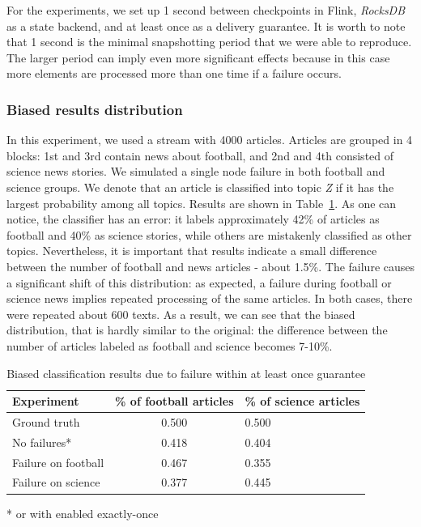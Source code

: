 
For the experiments, we set up 1 second between checkpoints in Flink, {\em RocksDB} as a state backend, and at least once as a delivery guarantee. It is worth to note that 1 second is the minimal snapshotting period that we were able to reproduce. The larger period can imply even more significant effects because in this case more elements are processed more than one time if a failure occurs.

\subsubsection{Biased results distribution}

In this experiment, we used a stream with 4000 articles. Articles are grouped in 4 blocks: 1st and 3rd contain news about football, and 2nd and 4th consisted of science news stories. We simulated a single node failure in both football and science groups. We denote that an article is classified into topic {\em Z} if it has the largest probability among all topics. Results are shown in Table~\ref{biased_results}. As one can notice, the classifier has an error: it labels approximately 42\% of articles as football and 40\% as science stories, while others are mistakenly classified as other topics. Nevertheless, it is important that results indicate a small difference between the number of football and news articles - about 1.5\%. The failure causes a significant shift of this distribution: as expected, a failure during football or science news implies repeated processing of the same articles. In both cases, there were repeated about 600 texts. As a result, we can see that the biased distribution, that is hardly similar to the original: the difference between the number of articles labeled as football and science becomes 7-10\%. 

\begin{table}[htbp]
\caption{Biased classification results due to failure within at least once guarantee}
\begin{threeparttable}
\begin{tabular}{lcl}
Experiment    & \% of football articles & \% of science articles    \\
\hline
Ground truth   &   0.500    &   0.500    \\
No failures*   &   0.418    &   0.404    \\
Failure on football   &   0.467    &   0.355    \\
Failure on science   &   0.377    &   0.445    \\
\end{tabular}
* or with enabled exactly-once
\end{threeparttable}
\label{biased_results}
\end{table}

